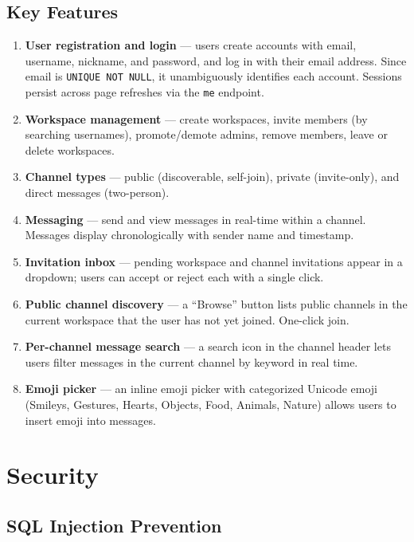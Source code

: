 \documentclass[11pt]{article}
\begin{document}
\subsection{Key Features}

\begin{enumerate}
    \item \textbf{User registration and login} --- users create accounts with email, username, nickname, and password, and log in with their email address. Since email is \texttt{UNIQUE NOT NULL}, it unambiguously identifies each account. Sessions persist across page refreshes via the \texttt{me} endpoint.
    \item \textbf{Workspace management} --- create workspaces, invite members (by searching usernames), promote/demote admins, remove members, leave or delete workspaces.
    \item \textbf{Channel types} --- public (discoverable, self-join), private (invite-only), and direct messages (two-person).
    \item \textbf{Messaging} --- send and view messages in real-time within a channel. Messages display chronologically with sender name and timestamp.
    \item \textbf{Invitation inbox} --- pending workspace and channel invitations appear in a dropdown; users can accept or reject each with a single click.
    \item \textbf{Public channel discovery} --- a ``Browse'' button lists public channels in the current workspace that the user has not yet joined. One-click join.
    \item \textbf{Per-channel message search} --- a search icon in the channel header lets users filter messages in the current channel by keyword in real time.
    \item \textbf{Emoji picker} --- an inline emoji picker with categorized Unicode emoji (Smileys, Gestures, Hearts, Objects, Food, Animals, Nature) allows users to insert emoji into messages.
\end{enumerate}


\newpage
\section{Security}
\label{sec:security}

\subsection{SQL Injection Prevention}
\end{document}
